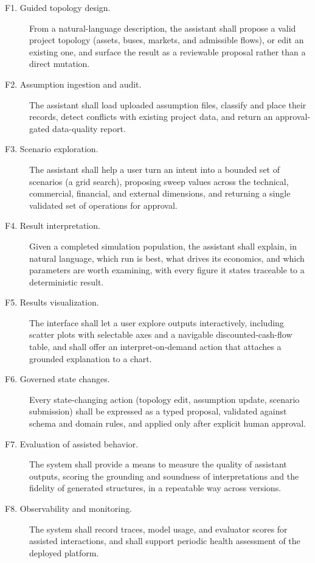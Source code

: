 \begin{description}
  \item[F1. Guided topology design.] From a natural-language description, the
    assistant shall propose a valid project topology (assets, buses, markets, and
    admissible flows), or edit an existing one, and surface the result as a
    reviewable proposal rather than a direct mutation.
  \item[F2. Assumption ingestion and audit.] The assistant shall load uploaded
    assumption files, classify and place their records, detect conflicts with
    existing project data, and return an approval-gated data-quality report.
  \item[F3. Scenario exploration.] The assistant shall help a user turn an intent
    into a bounded set of scenarios (a grid search), proposing sweep values
    across the technical, commercial, financial, and external dimensions, and
    returning a single validated set of operations for approval.
  \item[F4. Result interpretation.] Given a completed simulation
    population, the assistant shall explain, in natural language, which run is
    best, what drives its economics, and which parameters are worth examining,
    with every figure it states traceable to a deterministic result.
  \item[F5. Results visualization.] The interface shall let a user
    explore outputs interactively, including scatter plots with selectable axes
    and a navigable discounted-cash-flow table, and shall offer an
    interpret-on-demand action that attaches a grounded explanation to a chart.
  \item[F6. Governed state changes.] Every state-changing action (topology edit,
    assumption update, scenario submission) shall be expressed as a typed
    proposal, validated against schema and domain rules, and applied only after
    explicit human approval.
  \item[F7. Evaluation of assisted behavior.] The system shall provide
    a means to measure the quality of assistant outputs, scoring the grounding
    and soundness of interpretations and the fidelity of generated structures,
    in a repeatable way across versions.
  \item[F8. Observability and monitoring.] The system shall record traces, model
    usage, and evaluator scores for assisted interactions, and shall support
    periodic health assessment of the deployed platform.
\end{description}

